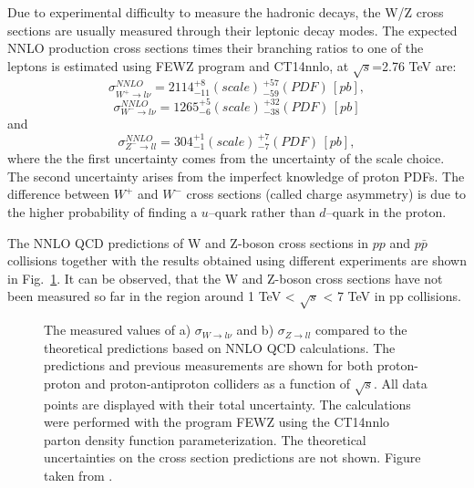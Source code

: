 Due to experimental difficulty to measure the hadronic decays, the  W/Z cross sections are usually measured through their leptonic decay modes. The expected NNLO production cross sections times their branching ratios to one of the leptons is estimated using FEWZ program\cite{FEWZ} and CT14nnlo\cite{CT14}, at $\sqrt{s}$=2.76 TeV are:
\begin{equation}\label{eq:WcsNNLO}
\sigma^{NNLO}_{W^+ \to l \nu} = 2114^{+8}_{-11}(scale)\, ^{+57}_{-59}(PDF)\, [pb],
\end{equation}
\begin{equation}
\sigma^{NNLO}_{W^- \to l \nu} = 1265^{+5}_{-6}(scale)\, ^{+32}_{-38}(PDF)\, [pb]
\end{equation}
and 
\begin{equation}\label{eq:ZcsNNLO}
\sigma^{NNLO}_{Z^- \to ll} = 304^{+1}_{-1}(scale)\, ^{+7}_{-7}(PDF)\, [pb],
\end{equation}
where the the first uncertainty comes from the uncertainty of the scale choice. The second uncertainty arises from the imperfect knowledge of proton PDFs. The difference between $W^{+}$ and $W^{-}$ cross sections (called charge asymmetry) is due to  the higher probability of finding a $u$--quark rather than $d$--quark in the proton.

The NNLO QCD predictions of W and Z-boson cross sections in $pp$ and $p\bar{p}$ collisions together with the results obtained using different experiments are shown in Fig.~\ref{fig:Zcs}. It can be observed, that the W and Z-boson cross sections have not been measured so far in the region around 1 TeV < $\sqrt{s}$ < 7 TeV in pp collisions.


\begin{figure}[!tbp]
\begin{minipage}[h]{1.0\linewidth}
\end{minipage}
\vfill
\begin{minipage}[h]{1.0\linewidth}
\end{minipage}
\caption{The measured values of a) $\sigma_{W \to l\nu}$ and b) $\sigma_{Z \to ll}$ compared to the theoretical predictions based on NNLO QCD calculations. The predictions and previous measurements are shown for both proton-proton and proton-antiproton colliders as a function of $\sqrt{s}$.  All data points are displayed with their total uncertainty. The calculations were performed with the program FEWZ using the CT14nnlo parton density function parameterization. The theoretical uncertainties on the cross section predictions are not shown. Figure taken from \cite{a13TeV}.}
\label{fig:Zcs}
\end{figure}

